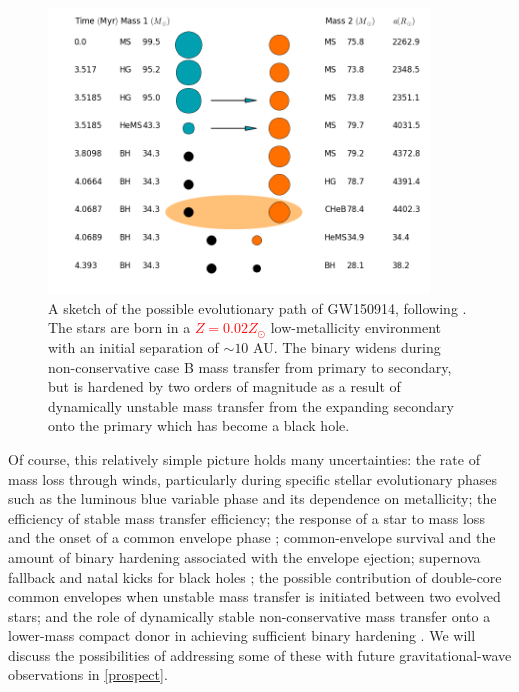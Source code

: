 \documentclass[iop,onecolumn]{revtex4}
\newcommand{\todo}[1]{\textcolor{red}{#1}}
\begin{document}
\begin{figure}
	\centering
	\includegraphics[width=0.9\textwidth]{COMPAS.png}
	\caption{\label{fig:COMPAS} A sketch of the possible evolutionary path of GW150914, following \citet{Stevenson:2017}.  The stars are born in a \todo{$Z=0.02 Z_\odot$} low-metallicity environment with an initial separation of $\sim 10$ AU.  The binary widens during non-conservative case B mass transfer from primary to secondary, but is hardened by two orders of magnitude as a result of dynamically unstable mass transfer from the expanding secondary onto the primary which has become a black hole.}
\end{figure}

Of course, this relatively simple picture holds many uncertainties: the rate of mass loss through winds, particularly during specific stellar evolutionary phases such as the luminous blue variable phase \citep{MennekensVanbeveren:2014} and its dependence on metallicity; the efficiency of stable mass transfer efficiency; the response of a star to mass loss and the onset of a common envelope phase \citep{Pavlovskii}; common-envelope survival and the amount of binary hardening associated with the envelope ejection; supernova fallback and natal kicks for black holes \citep[e.g.,][]{Repetto:2012,Mandel:2015kick}; the possible contribution of double-core common envelopes when unstable mass transfer is initiated between two evolved stars; and the role of dynamically stable non-conservative mass transfer onto a lower-mass compact donor in achieving sufficient binary hardening  \citep{vandenHeuvel:2016,Neijssel:2018}.  We will discuss the possibilities of addressing some of these with future gravitational-wave observations in \autoref{prospect}.
\end{document}
